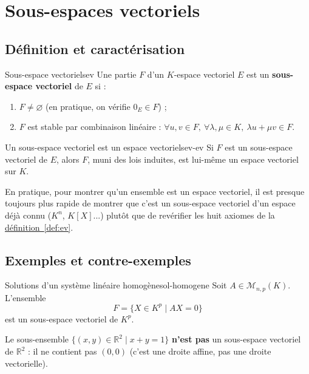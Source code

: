 \documentclass[theme=pringlea]{myrtille}
\begin{document}
\section{Sous-espaces vectoriels}

\subsection{Définition et caractérisation}
\begin{myrdef}{Sous-espace vectoriel}{sev}
Une partie $F$ d'un $K$-espace vectoriel $E$ est un \textbf{sous-espace vectoriel} de $E$ si :
\begin{enumerate}
    \item $F \neq \varnothing$ (en pratique, on vérifie $0_E \in F$) ;
    \item $F$ est stable par combinaison linéaire : $\forall u,v \in F,\ \forall \lambda, \mu \in K,\ \lambda u + \mu v \in F$.
\end{enumerate}
\end{myrdef}

\begin{myrthm}{Un sous-espace vectoriel est un espace vectoriel}{sev-ev}
Si $F$ est un sous-espace vectoriel de $E$, alors $F$, muni des lois induites, est lui-même un espace vectoriel sur $K$.
\end{myrthm}

\begin{infobox}
En pratique, pour montrer qu'un ensemble est un espace vectoriel, il est presque toujours plus rapide de montrer que c'est un sous-espace vectoriel d'un espace déjà connu ($K^n$, $K[X]$...) plutôt que de revérifier les huit axiomes de la \hyperref[def:ev]{définition~\ref*{def:ev}}.
\end{infobox}

\subsection{Exemples et contre-exemples}
\begin{myrthm}{Solutions d'un système linéaire homogène}{sol-homogene}
Soit $A \in \mathcal{M}_{n,p}(K)$. L'ensemble
\[ F = \{ X \in K^p \mid AX = 0 \} \]
est un sous-espace vectoriel de $K^p$.
\end{myrthm}

\begin{warnbox}
Le sous-ensemble $\{(x,y) \in \mathbb{R}^2 \mid x + y = 1\}$ \textbf{n'est pas} un sous-espace vectoriel de $\mathbb{R}^2$ : il ne contient pas $(0,0)$ (c'est une droite affine, pas une droite vectorielle).
\end{warnbox}
\end{document}
